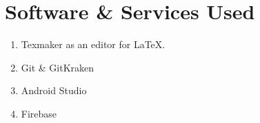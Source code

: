 \section{Software \& Services Used}
\begin{enumerate}
\item Texmaker as an editor for \LaTeX.
\item Git \& GitKraken
\item Android Studio
\item Firebase
\end{enumerate}